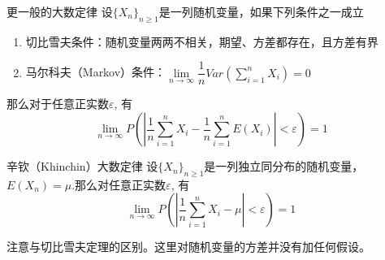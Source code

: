 
\begin{frame}

\begin{block}{更一般的大数定律}
设$\{X_n\}_{n\ge1}$是一列随机变量，如果下列条件之一成立
\begin{enumerate}
\item 切比雪夫条件：随机变量两两不相关，期望、方差都存在，且方差有界
\item 马尔科夫（Markov）条件：$\lim\limits_{n\to\infty} \dfrac{1}{n}Var\left( \sum\limits_{i=1}^n X_i \right) = 0$
\end{enumerate}
那么对于任意正实数$\varepsilon$, 有
\[\lim\limits_{n\to\infty} P\left( \left\vert \dfrac{1}{n}\sum\limits_{i=1}^n X_i - \dfrac{1}{n}\sum\limits_{i=1}^n E(X_i) \right\vert < \varepsilon \right) = 1\]
\end{block}

\end{frame}


\begin{frame}

\begin{block}{辛钦（Khinchin）大数定律}
设$\{X_n\}_{n\ge1}$是一列独立同分布的随机变量，$E(X_n) = \mu$.那么对任意正实数$\varepsilon$, 有
\[\lim\limits_{n\to\infty} P\left( \left\vert \dfrac{1}{n}\sum\limits_{i=1}^n X_i - \mu \right\vert < \varepsilon \right) = 1\]
\end{block}

\vspace{1em}
\pause

注意与切比雪夫定理的区别。这里对随机变量的方差并{\color{red}没有加任何假设}。

\end{frame}




